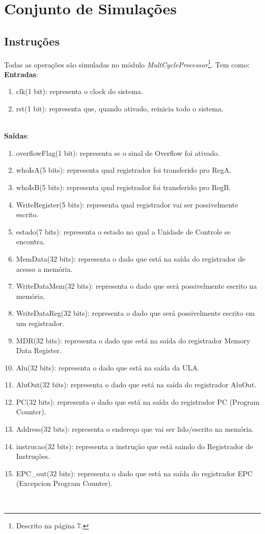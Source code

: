 \documentclass{article}
\begin{document}
    \newpage
    \section{Conjunto de Simulações}
    \subsection{Instruções}
    Todas as operações são simuladas no módulo {\it MultCycleProcessor}\footnote{Descrito na página 7.}. Tem como:\\
    \textbf{Entradas}:
    \begin{enumerate}
        \item clk(1 bit): representa o clock do sistema.
        \item rst(1 bit): representa que, quando ativado, reinicia todo o sistema.\\
    \end{enumerate}
\\
    \textbf{Saídas}:
    \begin{enumerate}
        \item overflowFlag(1 bit): representa se o sinal de Overflow foi ativado.
        \item whoIsA(5 bits): representa qual registrador foi transferido pro RegA.
        \item whoIsB(5 bits): representa qual registrador foi transferido pro RegB.
        \item WriteRegister(5 bits): representa qual registrador vai ser possivelmente escrito.
        \item estado(7 bits): representa o estado no qual a Unidade de Controle se encontra.
        \item MemData(32 bits): representa o dado que está na saída do registrador de acesso a memória.
        \item WriteDataMem(32 bits): representa o dado que será possivelmente escrito na memória.
        \item WriteDataReg(32 bits): representa o dado que será possivelmente escrito em um registrador.
        \item MDR(32 bits): representa o dado que está na saída do registrador Memory Data Register.
        \item Alu(32 bits): representa o dado que está na saída da ULA.
        \item AluOut(32 bits): representa o dado que está na saída do registrador AluOut.
        \item PC(32 bits): representa o dado que está na saída do registrador PC (Program Counter).
        \item Address(32 bits): representa o endereço que vai ser lido/escrito na memória.
        \item instrucao(32 bits): representa a instrução que está saindo do Registrador de Instruções.
        \item EPC\_out(32 bits): representa o dado que está na saída do registrador EPC (Excepcion Program Counter).\\
    \end{enumerate}\\
\end{document}
